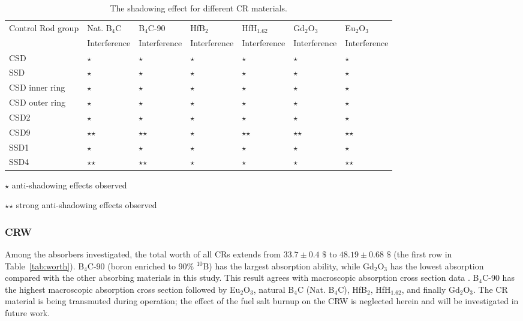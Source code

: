 \begin{sidewaystable}
	\fontsize{5}{7}\selectfont
	\centering
	\caption{The shadowing effect for different CR materials.}
	\vspace{0.1in}
		\begin{tabularx}{\textwidth}{|X|X|X|X|X|X|X|}
		\hline
		\multirow{2}{*}{Control Rod group}		& Nat. B$_4$C & B$_4$C-90  	&HfB$_2$
		&HfH$_{1.62}$
		&Gd$_2$O$_3$& 	
		Eu$_2$O$_3$ \\
		\cline{2-7}
		&  Interference
		& Interference	
		& Interference	
		& Interference	
		& Interference
		& Interference \\
		\hline                   
	CSD 		&	$\star$				& $\star$	&$\star$		&$\star$		&$\star$  &$\star$	 \\
	\hline 
	SSD		   &	$\star$				& $\star$	&$\star$		&$\star$		&$\star$  &$\star$	 \\ 
	\hline 
	CSD inner ring   &  	$\star$				& $\star$	&$\star$		&$\star$		&$\star$  &$\star$	 \\
	\hline 
	CSD outer ring       &	$\star$				& $\star$	&$\star$		&$\star$		&$\star$  &$\star$	 \\     
	\hline 
	CSD2			&	$\star$				& $\star$	&$\star$		&$\star$		&$\star$  &$\star$	 \\  
	\hline 
	CSD9		&	$\star$$\star$				& $\star$$\star$	&$\star$		&$\star$$\star$			&$\star$$\star$	  &$\star$$\star$		 \\ 	 
	\hline
	SSD1	&	$\star$				& $\star$	&$\star$		&$\star$		&$\star$  &$\star$ \\	  
	\hline 
	SSD4		&		$\star$$\star$			& 	$\star$$\star$	&$\star$		&$\star$		&$\star$  &	$\star$$\star$	 \\  
	\hline
	\end{tabularx}
	\begin{tablenotes}
	\tiny
	\item  $\star$  anti-shadowing effects observed
	\item  $\star$$\star$ strong anti-shadowing effects observed
\end{tablenotes}
	\label{tab:table25}
\end{sidewaystable}
\subsubsection{CRW} \label{CR_worth}

Among the absorbers investigated, the total worth of all CRs extends from $33.7\pm0.4$ $\$$ to $48.19\pm0.68$ 
$\$$ (the first row in Table~\ref{tab:worth}). B$_4$C-90 (boron enriched to 90\% $^{10}$B)
has the largest absorption ability, while Gd$_2$O$_3$ has the lowest 
absorption compared with the other absorbing materials in this study. This 
result agrees with macroscopic absorption cross section data 
\cite{guo2019optimized}. B$_4$C-90 has the highest macroscopic 
absorption cross section followed by Eu$_2$O$_3$, natural B$_4$C (Nat. B$_4$C), HfB$_2$, HfH$_{1.62}$, and 
finally Gd$_2$O$_3$. The CR material is being transmuted during 
operation; the effect of the fuel salt burnup on the CRW is neglected
herein and will be investigated in future work.

